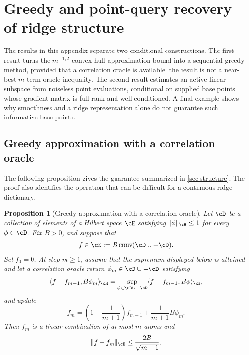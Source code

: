 \documentclass[11pt,twoside]{article}
\newtheorem{proposition}[theorem]{Proposition}
\theoremstyle{definition}
\theoremstyle{remark}
\begin{document}
\section{Greedy and point-query recovery of ridge structure}
\label{app:active-query-recovery}

The results in this appendix separate two conditional constructions. The
first result turns the $m^{-1/2}$ convex-hull approximation bound into a
sequential greedy method, provided that a correlation oracle is available;
the result is not a near-best $m$-term oracle inequality. The second result
estimates an active linear subspace from noiseless point evaluations,
conditional on supplied base points whose gradient matrix is full rank and
well conditioned. A final example shows why smoothness and a ridge
representation alone do not guarantee such informative base points.

\subsection{Greedy approximation with a correlation oracle}

The following proposition gives the guarantee summarized in
\cref{sec:structure}. The proof also identifies the operation that can be
difficult for a continuous ridge dictionary.

\begin{proposition}[Greedy approximation with a correlation oracle]
\label{prop:greedy-oracle}
Let $\cD$ be a collection of elements of a Hilbert space $\cH$ satisfying
$\|\phi\|_{\cH}\leq1$ for every $\phi\in\cD$. Fix $B>0$, and suppose that
\begin{equation}
 f\in \cK:=B\,\overline{\operatorname{conv}}(\cD\cup-\cD).
 \label{eq:greedy-feasible-set}
\end{equation}
Set $f_0=0$. At step $m\geq1$, assume that the supremum displayed below is
attained and let a correlation oracle return
$\phi_m\in\cD\cup-\cD$ satisfying
\begin{equation}
 \langle f-f_{m-1},B\phi_m\rangle_{\cH}
 =\sup_{\phi\in\cD\cup-\cD}
   \langle f-f_{m-1},B\phi\rangle_{\cH},
 \label{eq:correlation-oracle}
\end{equation}
and update
\begin{equation}
 f_m=\left(1-\frac1{m+1}\right)f_{m-1}
     +\frac1{m+1}B\phi_m.
 \label{eq:relaxed-greedy-update}
\end{equation}
Then $f_m$ is a linear combination of at most $m$ atoms and
\begin{equation}
 \|f-f_m\|_{\cH}\leq \frac{2B}{\sqrt{m+1}}.
 \label{eq:greedy-oracle-bound}
\end{equation}
\end{proposition}
\end{document}
